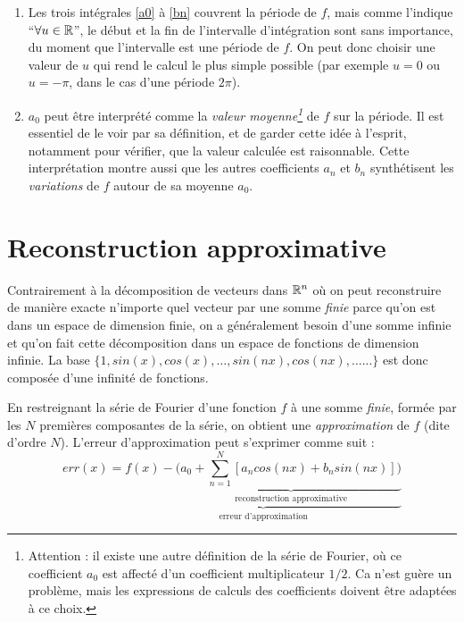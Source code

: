 \begin{enumerate}
\item Les trois intégrales \ref{a0} à \ref{bn}  couvrent la période de $f$,
  mais comme l'indique ``$\forall u\in \mathbb{R}$'', le début et la fin de
  l'intervalle d'intégration sont sans importance, du moment que
  l'intervalle est une période de $f$. On peut  donc choisir une
  valeur de $u$ qui rend le calcul le plus simple possible (par exemple $u=0$ ou $u=-\pi$, dans le cas d'une période $2\pi$).
\item $a_0$ peut être interprété comme la \emph{valeur
  moyenne\footnote{Attention : il existe une autre définition de la
  série de Fourier, où ce coefficient $a_0$ est affecté d'un
  coefficient multiplicateur $1/2$. Ca n'est guère un problème, mais
  les expressions de calculs des coefficients doivent être adaptées à
  ce choix.}} de $f$ sur la
  période. Il est essentiel de le voir par sa définition, et de garder
  cette idée à l'esprit, notamment pour vérifier, que la
  valeur calculée est raisonnable. Cette interprétation montre aussi que les autres
  coefficients $a_n$ et $b_n$ synthétisent les \emph{variations} de
  $f$ autour de sa moyenne $a_0$.
\end{enumerate}

\section{Reconstruction approximative} 

Contrairement à la décomposition de vecteurs dans $\mathbb{R}^n$ où on peut reconstruire de manière exacte n'importe quel vecteur par une somme \emph{finie} parce qu'on est dans un espace de dimension finie, on a généralement besoin d'une somme infinie et qu'on fait cette décomposition dans un espace de fonctions de dimension infinie. La base $\{1,sin(x),cos(x),\dots,sin(nx),cos(nx),\dots...\}$ est donc composée d'une infinité de fonctions.

En restreignant la série de Fourier d'une fonction $f$ à une somme
\emph{finie}, formée par les $N$ premières composantes de la série, on obtient une
\emph{approximation} de $f$ (dite d'ordre $N$). L'erreur d'approximation peut s'exprimer comme suit :
\begin{equation}
err(x)=\underbrace{  f(x)- \Big( \underbrace{a_0+\sum_{n=1}^{N}[a_n cos(nx) + b_n sin(nx)]\Big)}_{\text{reconstruction approximative}}}_{\text{erreur d'approximation}}
\label{erreur_approx}
\end{equation}

